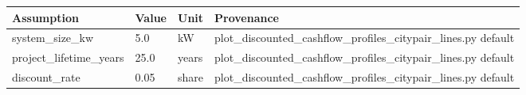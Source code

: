 {\small
\begin{tabular}{llll}
\toprule
Assumption & Value & Unit & Provenance \\
\midrule
system\_size\_kw & 5.0 & kW & plot\_discounted\_cashflow\_profiles\_citypair\_lines.py default \\
project\_lifetime\_years & 25.0 & years & plot\_discounted\_cashflow\_profiles\_citypair\_lines.py default \\
discount\_rate & 0.05 & share & plot\_discounted\_cashflow\_profiles\_citypair\_lines.py default \\
\bottomrule
\end{tabular}
}
